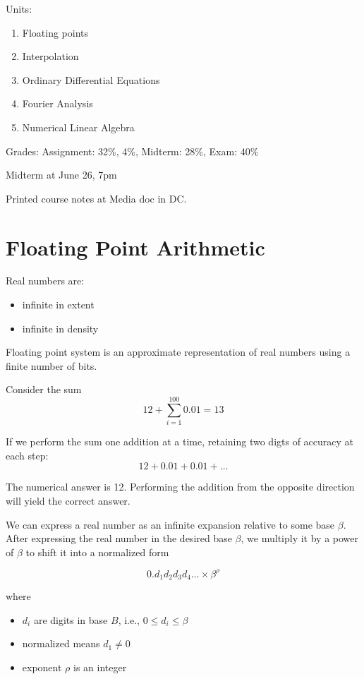 \documentclass[12pt]{article}
\begin{document}
Units: 
\begin{enumerate}
    \item Floating points
\item Interpolation
\item Ordinary Differential Equations
\item Fourier Analysis
\item Numerical Linear Algebra

\end{enumerate}

Grades: Assignment: 32\%, 4\%, Midterm: 28\%, Exam: 40\%

Midterm at June 26, 7pm

Printed course notes at Media doc in DC. 


\section{Floating Point Arithmetic}

Real numbers are: 
\begin{itemize}
\item infinite in extent
\item infinite in density
\end{itemize}

Floating point system is an approximate representation of real numbers using a finite number of bits. 

Consider the sum
$$12 + \sum^{100}_{i=1} 0.01 = 13$$

If we perform the sum one addition at a time, retaining two digts of accuracy at each step: 
$$12 + 0.01 + 0.01 + \dots $$

The numerical answer is 12. Performing the addition from the opposite direction will yield the correct answer. 

We can express a real number as an infinite expansion relative to some base $\beta$. After expressing the real number in the desired base $\beta$, we multiply it by a power of $\beta$ to shift it into a normalized form

$$0.d_1d_2d_3d_4 \dots \times \beta^\rho$$

where
\begin{itemize}
\item $d_i$ are digits in base $B$, i.e., $0 \leq d_i \le \beta$
\item normalized means $d_1 \neq 0$
\item exponent $\rho$ is an integer
\end{itemize}
\end{document}
